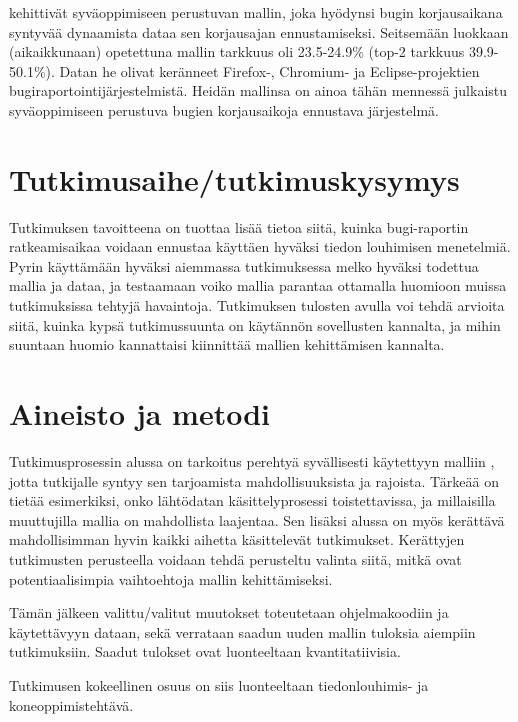 \documentclass[utf8]{gradu3}
\begin{document}
\textcite{Lee-2020} kehittivät syväoppimiseen perustuvan mallin, joka hyödynsi
bugin korjausaikana syntyvää dynaamista dataa sen korjausajan ennustamiseksi.
Seitsemään luokkaan (aikaikkunaan) opetettuna  mallin tarkkuus oli 23.5-24.9\%
(top-2 tarkkuus 39.9-50.1\%). Datan he olivat keränneet Firefox-, Chromium- ja
Eclipse-projektien bugiraportointijärjestelmistä. Heidän mallinsa on ainoa tähän
mennessä julkaistu syväoppimiseen perustuva bugien korjausaikoja ennustava
järjestelmä.

\chapter{Tutkimusaihe/tutkimuskysymys}
Tutkimuksen tavoitteena on tuottaa lisää tietoa siitä, kuinka bugi-raportin
ratkeamisaikaa voidaan ennustaa käyttäen hyväksi tiedon louhimisen menetelmiä.
Pyrin käyttämään hyväksi aiemmassa tutkimuksessa \parencite{riivo-2016} melko
hyväksi todettua mallia ja dataa, ja testaamaan voiko mallia parantaa ottamalla
huomioon muissa tutkimuksissa tehtyjä havaintoja. Tutkimuksen tulosten avulla
voi tehdä arvioita siitä, kuinka kypsä tutkimussuunta on käytännön sovellusten
kannalta, ja mihin suuntaan huomio kannattaisi kiinnittää mallien kehittämisen
kannalta.

\chapter{Aineisto ja metodi}
Tutkimusprosessin alussa on tarkoitus perehtyä syvällisesti käytettyyn malliin
\parencite{riivo-2016}, jotta tutkijalle syntyy sen tarjoamista
mahdollisuuksista ja rajoista. Tärkeää on tietää esimerkiksi, onko lähtödatan
käsittelyprosessi toistettavissa, ja millaisilla muuttujilla mallia on
mahdollista laajentaa. Sen lisäksi alussa on myös kerättävä mahdollisimman hyvin
kaikki aihetta käsittelevät tutkimukset. Kerättyjen tutkimusten perusteella
voidaan tehdä perusteltu valinta siitä, mitkä ovat potentiaalisimpia
vaihtoehtoja mallin kehittämiseksi.

Tämän jälkeen valittu/valitut muutokset toteutetaan ohjelmakoodiin ja
käytettävyyn dataan, sekä verrataan saadun uuden mallin tuloksia aiempiin
tutkimuksiin. Saadut tulokset ovat luonteeltaan kvantitatiivisia. 

Tutkimusen kokeellinen osuus on siis luonteeltaan tiedonlouhimis- ja
koneoppimistehtävä.
\end{document}
